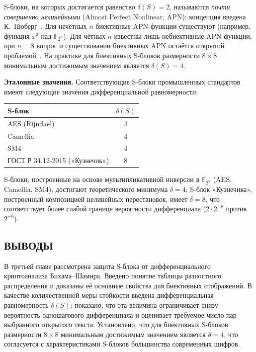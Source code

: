 S-блоки, на которых достигается равенство $\delta(S) = 2$, называются
\emph{почти совершенно нелинейными} (Almost Perfect Nonlinear, APN);
концепция введена К.~Нюберг~\cite{nyberg1993apn}.
Для нечётных $n$ биективные APN-функции существуют (например, функция
$x^3$ над $\mathbb{F}_{2^n}$). Для чётных $n$ известны лишь небиективные
APN-функции; при $n = 8$ вопрос о существовании биективных APN остаётся
открытой проблемой~\cite{carlet2021book}. На практике для биективных
S-блоков размерности $8 \times 8$ минимальным достижимым значением
является $\delta(S) = 4$.

\medskip
\textbf{Эталонные значения.} Соответствующие S-блоки промышленных стандартов
имеют следующие значения дифференциальной равномерности:

\begin{center}
\begin{tabular}{lc}
\hline
S-блок & $\delta(S)$ \\
\hline
AES (Rijndael)     & 4 \\
Camellia           & 4 \\
SM4                & 4 \\
ГОСТ Р 34.12-2015 («Кузнечик») & 8 \\
\hline
\end{tabular}
\end{center}

S-блоки, построенные на основе мультипликативной инверсии в $\mathbb{F}_{2^8}$
(AES, Camellia, SM4), достигают теоретического минимума $\delta = 4$;
S-блок «Кузнечика», построенный композицией нелинейных перестановок,
имеет $\delta = 8$, что соответствует более слабой границе вероятности
дифференциала ($2 \cdot 2^{-8}$ против $2^{-6}$).

\subsection*{ВЫВОДЫ}

В третьей главе рассмотрена защита S-блока от дифференциального
криптоанализа Бихама–Шамира. Введено понятие таблицы разностного
распределения и доказаны её основные свойства для биективных
отображений. В качестве количественной меры стойкости введена
дифференциальная равномерность $\delta(S)$; показано, что эта величина
ограничивает снизу вероятность одношагового дифференциала и
оценивает требуемое число пар выбранного открытого текста. Установлено,
что для биективных S-блоков размерности $8 \times 8$ минимальным
достижимым значением является $\delta = 4$, что согласуется с
характеристиками S-блоков большинства современных шифров.


